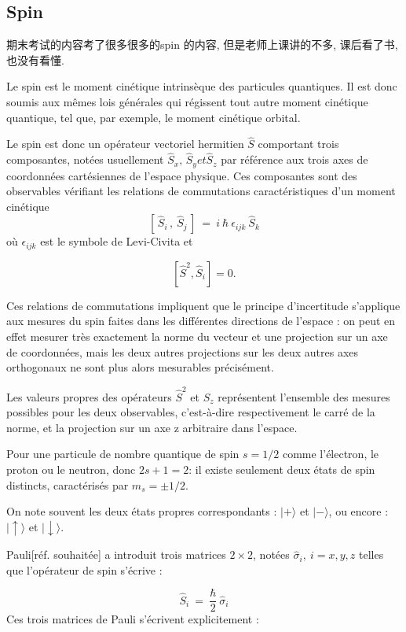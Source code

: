 \documentclass{article}
\begin{document}
\subsection{Spin}
期末考试的内容考了很多很多的spin 的内容, 但是老师上课讲的不多, 课后看了书, 也没有看懂.

Le spin est le moment cinétique intrinsèque des particules quantiques. Il est donc soumis aux mêmes lois générales qui régissent tout autre moment cinétique quantique, tel que, par exemple, le moment cinétique orbital.

Le spin est donc un opérateur vectoriel hermitien $\hat S$ comportant trois composantes, notées usuellement $\hat{S}_x, \, \hat{S}_y et  \hat{S}_z$ par référence aux trois axes de coordonnées cartésiennes de l'espace physique. Ces composantes sont des observables vérifiant les relations de commutations caractéristiques d'un moment cinétique
$$ \left[ \, \hat{S}_i \, , \ \hat{S}_j \, \right] \ = \ i \  \hbar \ \epsilon_{ijk} \ \hat{S}_k $$
où $\epsilon_{ijk}$ est le symbole de Levi-Civita et

$$ \left [\hat S^2, \hat S_i \right ]=0.  $$

Ces relations de commutations impliquent que le principe d'incertitude s'applique aux mesures du spin faites dans les différentes directions de l'espace : on peut en effet mesurer très exactement la norme du vecteur et une projection sur un axe de coordonnées, mais les deux autres projections sur les deux autres axes orthogonaux ne sont plus alors mesurables précisément.

Les valeurs propres des opérateurs $\hat S^2$ et $\hat S_z$ représentent l'ensemble des mesures possibles pour les deux observables, c'est-à-dire respectivement le carré de la norme, et la projection sur un axe z arbitraire dans l'espace.

Pour une particule de nombre quantique de spin $s = 1/2$ comme l'électron, le proton ou le neutron, donc $2s + 1 = 2$: 
il existe seulement deux états de spin distincts, caractérisés par $m_s = \pm 1/2$.

On note souvent les deux états propres correspondants : $|+\rangle$  et $|-\rangle$, ou encore : $|\uparrow\rangle$  et $|\downarrow\rangle$.

Pauli[réf. souhaitée] a introduit trois matrices $2 × 2$, notées $\hat{\sigma}_i, \ i = x,y,z$ telles que l'opérateur de spin s'écrive :

$$ \hat{S}_i  \ = \ \frac{\hbar}{2} \ \hat{\sigma}_i $$
Ces trois matrices de Pauli s'écrivent explicitement :
\end{document}

